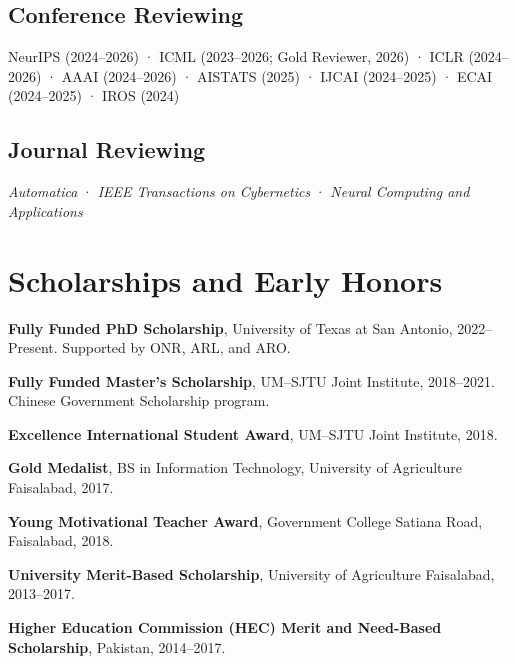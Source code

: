 \documentclass[letterpaper,11pt]{article}
\begin{document}

\subsection*{Conference Reviewing}

NeurIPS (2024--2026) · ICML (2023--2026; Gold Reviewer, 2026) · ICLR (2024--2026) · AAAI (2024--2026) · AISTATS (2025) · IJCAI (2024--2025) · ECAI (2024--2025) · IROS (2024)

\subsection*{Journal Reviewing}
\textit{Automatica} · \textit{IEEE Transactions on Cybernetics} · \textit{Neural Computing and Applications}

\section*{Scholarships and Early Honors}
\begin{cvlist}
    \item \textbf{Fully Funded PhD Scholarship}, University of Texas at San Antonio, 2022--Present. Supported by ONR, ARL, and ARO.
    \item \textbf{Fully Funded Master's Scholarship}, UM--SJTU Joint Institute, 2018--2021. Chinese Government Scholarship program.
    \item \textbf{Excellence International Student Award}, UM--SJTU Joint Institute, 2018.
    \item \textbf{Gold Medalist}, BS in Information Technology, University of Agriculture Faisalabad, 2017.
    \item \textbf{Young Motivational Teacher Award}, Government College Satiana Road, Faisalabad, 2018.
    \item \textbf{University Merit-Based Scholarship}, University of Agriculture Faisalabad, 2013--2017.
    \item \textbf{Higher Education Commission (HEC) Merit and Need-Based Scholarship}, Pakistan, 2014--2017.
\end{cvlist}
\end{document}
